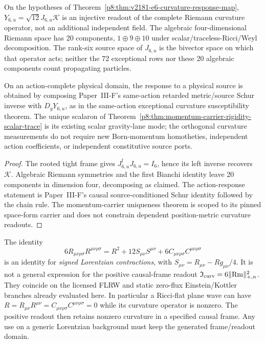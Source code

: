 \documentclass[12pt,a4paper]{article}
\begin{document}
\begin{theorem}
\label{p8:thm:v2166-geometry-response-owner}
On the hypotheses of
Theorem~\ref{p8:thm:v2181-e6-curvature-response-map},
\(Y_{6,u}=\sqrt{12}J_{6,u}\mathcal K\) is an injective readout of
the complete Riemann curvature operator, not an additional independent
field.  The algebraic four-dimensional Riemann space has 20 components,
\(1\oplus9\oplus10\) under scalar/traceless-Ricci/Weyl decomposition.
The rank-six source space of \(J_{6,u}\) is the bivector space on which
that operator acts; neither the 72 exceptional rows nor these 20 algebraic
components count propagating particles.

On an action-complete physical domain, the response to a physical source is
obtained by composing Paper~III-F's same-action retarded metric/source Schur
inverse with \(D_gY_{6,u}\), as in the same-action exceptional curvature
susceptibility theorem.  The unique scalaron of
Theorem~\ref{p8:thm:momentum-carrier-rigidity-scalar-trace} is its existing
scalar gravity-lane mode; the orthogonal curvature measurements do not
require new Born-momentum homotheties, independent action coefficients, or
independent constitutive source ports.
\end{theorem}
\begin{proof}
The rooted tight frame gives \(J_{6,u}^\dagger J_{6,u}=I_6\), hence its
left inverse recovers \(\mathcal K\).  Algebraic Riemann symmetries and the
first Bianchi identity leave 20 components in dimension four, decomposing as
claimed.  The action-response statement is Paper~III-F's causal
source-conditioned Schur identity followed by the chain rule.  The
momentum-carrier uniqueness theorem is scoped to its pinned space-form
carrier and does not constrain dependent position-metric curvature readouts.
\end{proof}

\begin{proposition}
\label{p8:prop:v2166-signed-positive-firewall}
The identity
\[
 6R_{\mu\nu\rho\sigma}R^{\mu\nu\rho\sigma}
 =R^2+12S_{\mu\nu}S^{\mu\nu}
 +6C_{\mu\nu\rho\sigma}C^{\mu\nu\rho\sigma}
\]
is an identity for \emph{signed Lorentzian contractions}, with
\(S_{\mu\nu}=R_{\mu\nu}-Rg_{\mu\nu}/4\).  It is not a general
expression for the positive causal-frame readout
\(\mathfrak I_{\rm curv}=6\|\mathrm{Rm}\|_{+,n}^2\).
They coincide on the licensed FLRW and static zero-flux Einstein/Kottler
branches already evaluated here.  In particular a Ricci-flat plane wave can
have \(R=R_{\mu\nu}R^{\mu\nu}
=C_{\mu\nu\rho\sigma}C^{\mu\nu\rho\sigma}=0\)
while its curvature operator is nonzero.  The positive readout then retains
nonzero curvature in a specified causal frame.  Any use on a generic
Lorentzian background must keep the generated frame/readout domain.
\end{proposition}
\end{document}
